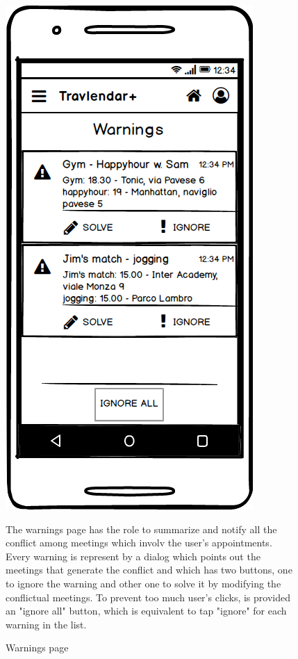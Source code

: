 \documentclass[11pt]{article}
\begin{document}
	\begin{figure}
		\centering
		\includegraphics[width=0.7\linewidth]{Warnings.png}
		\caption{Warnings page}
		\label{fig:warnings}
		\begin{center}
			The warnings page has the role to summarize and notify all the conflict among meetings which involv the user's appointments. Every warning is represent by a dialog which points out the meetings that generate the conflict and which has two buttons, one to ignore the warning and other one to solve it by modifying the conflictual meetings. 
			To prevent too much user's clicks, is provided an "ignore all" button, which is equivalent to tap "ignore" for each warning in the list. 
		\end{center}
	\end{figure}
\end{document}
